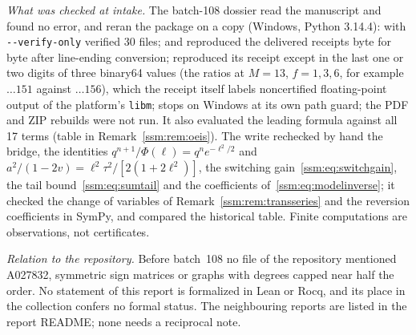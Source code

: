\begin{writenote}
\emph{What was checked at intake.} The batch-108 dossier read the
manuscript and found no error, and reran the package on a copy (Windows,
Python 3.14.4):  with \verb|--verify-only| verified 30 files;
 and  reproduced the
delivered receipts byte for byte after line-ending conversion;
 reproduced its receipt except in the last one or two
digits of three binary64 values (the ratios 
at $M=13$, $f=1,3,6$, for example $\ldots151$ against $\ldots156$), which
the receipt itself labels noncertified floating-point output of the
platform's \texttt{libm};  stops on Windows at its own
path guard; the PDF and ZIP rebuilds were not run. It also evaluated the
leading formula against all 17 terms (table in Remark~\ref{ssm:rem:oeis}).
The write rechecked by hand the bridge, the identities $q^{n+1}/\Phi(\ell)
=q^ne^{-\ell^2/2}$ and $a^2/(1-2v)=\ell^2\tau^2/[2(1+2\ell^2)]$, the switching
gain~\eqref{ssm:eq:switchgain}, the tail bound~\eqref{ssm:eq:sumtail} and
the coefficients of~\eqref{ssm:eq:modelinverse}; it checked the change of
variables of Remark~\ref{ssm:rem:transseries} and the reversion
coefficients in SymPy, and compared the historical table. Finite
computations are observations, not certificates.

\emph{Relation to the repository.} Before batch~108 no file of the
repository mentioned A027832, symmetric sign matrices or graphs with
degrees capped near half the order. No statement of this report is
formalized in Lean or Rocq, and its place in the collection confers no
formal status. The neighbouring reports are listed in the report README;
none needs a reciprocal note.
\end{writenote}
